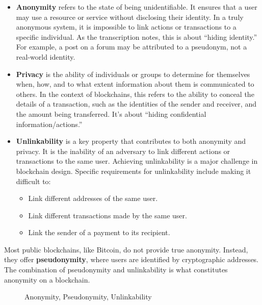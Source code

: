 \begin{itemize}
\item
  \textbf{Anonymity} refers to the state of being unidentifiable. It
  ensures that a user may use a resource or service without disclosing
  their identity. In a truly anonymous system, it is impossible to link
  actions or transactions to a specific individual. As the transcription
  notes, this is about ``hiding identity.'' For example, a post on a
  forum may be attributed to a pseudonym, not a real-world identity.
\item
  \textbf{Privacy} is the ability of individuals or groups to determine
  for themselves when, how, and to what extent information about them is
  communicated to others. In the context of blockchains, this refers to
  the ability to conceal the details of a transaction, such as the
  identities of the sender and receiver, and the amount being
  transferred. It's about ``hiding confidential information/actions.''
\item
  \textbf{Unlinkability} is a key property that contributes to both
  anonymity and privacy. It is the inability of an adversary to link
  different actions or transactions to the same user. Achieving
  unlinkability is a major challenge in blockchain design. Specific
  requirements for unlinkability include making it difficult to:

  \begin{itemize}
  \tightlist
  \item
    Link different addresses of the same user.
  \item
    Link different transactions made by the same user.
  \item
    Link the sender of a payment to its recipient.
  \end{itemize}
\end{itemize}

Most public blockchains, like Bitcoin, do not provide true anonymity.
Instead, they offer \textbf{pseudonymity}, where users are identified by
cryptographic addresses. The combination of pseudonymity and
unlinkability is what constitutes anonymity on a blockchain.

\begin{figure}
\centering
\caption{Anonymity, Pseudonymity, Unlinkability}
\end{figure}

